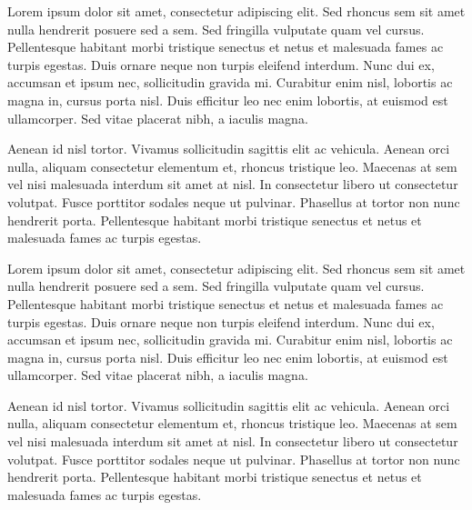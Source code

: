 \newif\ifcharta
\chartatrue






\date{\today}
\opening{}
\closing{}

\makelettertitle

\ifenglish

Lorem ipsum dolor sit amet, consectetur adipiscing elit. Sed rhoncus
sem sit amet nulla hendrerit posuere sed a sem. Sed fringilla
vulputate quam vel cursus. Pellentesque habitant morbi tristique
senectus et netus et malesuada fames ac turpis egestas. Duis ornare
neque non turpis eleifend interdum. Nunc dui ex, accumsan et ipsum
nec, sollicitudin gravida mi. Curabitur enim nisl, lobortis ac magna
in, cursus porta nisl. Duis efficitur leo nec enim lobortis, at
euismod est ullamcorper. Sed vitae placerat nibh, a iaculis magna.

Aenean id nisl tortor. Vivamus sollicitudin sagittis elit ac vehicula.
Aenean orci nulla, aliquam consectetur elementum et, rhoncus tristique
leo. Maecenas at sem vel nisi malesuada interdum sit amet at nisl. In
consectetur libero ut consectetur volutpat. Fusce porttitor sodales
neque ut pulvinar. Phasellus at tortor non nunc hendrerit porta.
Pellentesque habitant morbi tristique senectus et netus et malesuada
fames ac turpis egestas.

\fi

\ifspanish

Lorem ipsum dolor sit amet, consectetur adipiscing elit. Sed rhoncus
sem sit amet nulla hendrerit posuere sed a sem. Sed fringilla
vulputate quam vel cursus. Pellentesque habitant morbi tristique
senectus et netus et malesuada fames ac turpis egestas. Duis ornare
neque non turpis eleifend interdum. Nunc dui ex, accumsan et ipsum
nec, sollicitudin gravida mi. Curabitur enim nisl, lobortis ac magna
in, cursus porta nisl. Duis efficitur leo nec enim lobortis, at
euismod est ullamcorper. Sed vitae placerat nibh, a iaculis magna.

Aenean id nisl tortor. Vivamus sollicitudin sagittis elit ac vehicula.
Aenean orci nulla, aliquam consectetur elementum et, rhoncus tristique
leo. Maecenas at sem vel nisi malesuada interdum sit amet at nisl. In
consectetur libero ut consectetur volutpat. Fusce porttitor sodales
neque ut pulvinar. Phasellus at tortor non nunc hendrerit porta.
Pellentesque habitant morbi tristique senectus et netus et malesuada
fames ac turpis egestas.

\fi

\makeletterclosing


